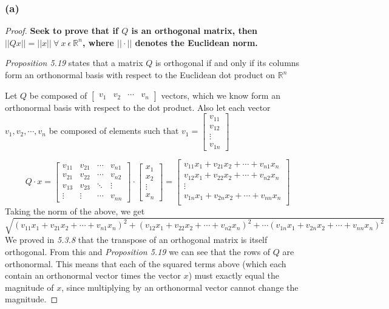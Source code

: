 \documentclass[10pt,letterpaper]{article}
\begin{document}
	\subsubsection*{(a)}
	\begin{proof}
		\textbf{Seek to prove that if $Q$ is an orthogonal matrix, then $||Qx|| = ||x|| \: \forall \: x \: \epsilon \: \mathbb{R}^n$, where $||\cdot||$ denotes the Euclidean norm. }
		
		\textit{Proposition 5.19} states that a matrix $Q$ is orthogonal if and only if its columns form an orthonormal basis with respect to the Euclidean dot product on $\mathbb{R}^n$
		
		Let $Q$ be composed of $\begin{bmatrix}
		v_1 & v_2 & \cdots & v_n
		\end{bmatrix}$ vectors, which we know form an orthonormal basis with respect to the dot product. Also let each vector $v_1,v_2,\cdots,v_n$ be composed of elements such that $v_1 = \begin{bmatrix}
		v_{11} \\ v_{12} \\ \vdots \\ v_{1n}
		\end{bmatrix}$
		
		$$
		Q \cdot x = \begin{bmatrix}
		v_{11} & v_{21} & \cdots & v_{n1} \\
		v_{21} & v_{22} & \cdots & v_{n2} \\ 
		v_{13} & v_{23} & \ddots & \vdots \\ 
		\vdots & \vdots & \cdots & v_{nn}
		\end{bmatrix} \cdot \begin{bmatrix}
		x_1 \\ x_2 \\ \vdots \\ x_n
		\end{bmatrix} = \begin{bmatrix}
		v_{11}x_1 + v_{21}x_2 + \cdots + v_{n1}x_n \\ 
		v_{12}x_1 + v_{22}x_2 + \cdots + v_{n2}x_n \\
		\vdots \\ 
		v_{1n}x_1 + v_{2n}x_2 + \cdots + v_{nn}x_n \\  
		\end{bmatrix}
		$$
		Taking the norm of the above, we get 
		$$
		\sqrt{(v_{11}x_1 + v_{21}x_2 + \cdots + v_{n1}x_n)^2 + (v_{12}x_1 + v_{22}x_2 + \cdots + v_{n2}x_n)^2 + \cdots (v_{1n}x_1 + v_{2n}x_2 + \cdots + v_{nn}x_n)^2}
		$$
		We proved in \textit{5.3.8} that the transpose of an orthogonal matrix is itself orthogonal. From this and \textit{Proposition 5.19} we can see that the rows of $Q$ are orthonormal. This means that each of the squared terms above (which each contain an orthonormal vector times the vector $x$) must exactly equal the magnitude of $x$, since multiplying by an orthonormal vector cannot change the magnitude.
	\end{proof}
\end{document}
